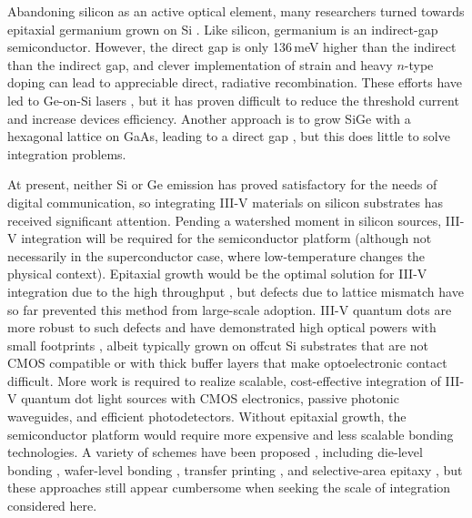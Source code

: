 \documentclass[twocolumn]{article}
\begin{document}
Abandoning silicon as an active optical element, many researchers turned towards epitaxial germanium grown on Si \cite{sun2009toward}. Like silicon, germanium is an indirect-gap semiconductor. However, the direct gap is only 136\,meV higher than the indirect than the indirect gap, and clever implementation of strain \cite{ishikawa2003strain,ghrib2012control,tani2021enhanced} and heavy $n$-type doping \cite{liu2007tensile,el2009enhanced,sun2009direct,camacho2013direct,virgilio2013radiative} can lead to appreciable direct, radiative recombination. These efforts have led to Ge-on-Si lasers \cite{sun2009room,liu2010ge}, but it has proven difficult to reduce the threshold current and increase devices efficiency. Another approach is to grow SiGe with a hexagonal lattice on GaAs, leading to a direct gap \cite{Fadaly2020}, but this does little to solve integration problems.

At present, neither Si or Ge emission has proved satisfactory for the needs of digital communication, so integrating III-V materials on silicon substrates has received significant attention. Pending a watershed moment in silicon sources, III-V integration will be required for the semiconductor platform (although not necessarily in the superconductor case, where low-temperature changes the physical context). Epitaxial growth would be the optimal solution for III-V integration due to the high throughput \cite{norman2018perspective}, but defects due to lattice mismatch have so far prevented this method from large-scale adoption. III-V quantum dots are more robust to such defects and have demonstrated high optical powers with small footprints \cite{chli2016,jung2017high, norman2018perspective}, albeit typically grown on offcut Si substrates that are not CMOS compatible or with thick buffer layers that make optoelectronic contact difficult. More work is required to realize scalable, cost-effective integration of III-V quantum dot light sources with CMOS electronics, passive photonic waveguides, and efficient photodetectors. Without epitaxial growth, the semiconductor platform would require more expensive and less scalable bonding technologies. A variety of schemes have been proposed \cite{norman2018perspective,tang2019integration}, including die-level bonding \cite{sost2016,crsa2017}, wafer-level bonding \cite{huli2019,szha2019,jito2020}, transfer printing \cite{jubo2012,zhha2018,zhang2019iii}, and selective-area epitaxy \cite{haxu2021}, but these approaches still appear cumbersome when seeking the scale of integration considered here.
\end{document}

